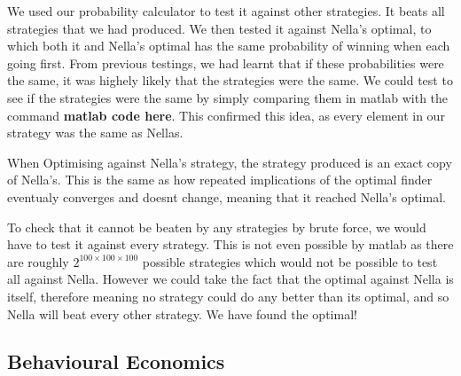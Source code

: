 \documentclass[a4paper,titlepage]{article}
\begin{document}
We used our probability calculator to test it against other strategies. It beats all strategies that we had produced. We then tested it against Nella's optimal, to which both it and Nella's optimal has the same probability of winning when each going first. From previous testings, we had learnt that if these probabilities were the same, it was highely likely that the strategies were the same. We could test to see if the strategies were the same by simply comparing them in matlab with the command \textbf{matlab code here}. This confirmed this idea, as every element in our strategy was the same as Nellas.

When Optimising against Nella's strategy, the strategy produced is an exact copy of Nella's. This is the same as how repeated implications of the optimal finder eventualy converges and doesnt change, meaning that it reached Nella's optimal.

To check that it cannot be beaten by any strategies by brute force, we would have to test it against every strategy. This is not even possible by matlab as there are roughly $2^{100\times100\times100}$ possible strategies which would not be possible to test all against Nella. However we could take the fact that the optimal against Nella is itself, therefore meaning no strategy could do any better than its optimal, and so Nella will beat every other strategy. We have found the optimal!

\subsection{Behavioural Economics}
\end{document}

